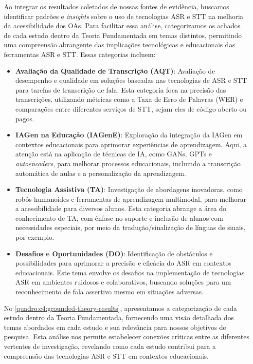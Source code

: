 Ao integrar os resultados coletados de nossas fontes de evidência, buscamos identificar padrões e \textit{insights} sobre o uso de tecnologias ASR e STT na melhoria da acessibilidade dos OAs. Para facilitar essa análise, categorizamos os achados de cada estudo dentro da Teoria Fundamentada em temas distintos, permitindo uma compreensão abrangente das implicações tecnológicas e educacionais das ferramentas ASR e STT. Essas categorias incluem:

\begin{itemize}
\item \textbf{Avaliação da Qualidade de Transcrição (AQT)}: Avaliação de desempenho e qualidade em soluções baseadas nas tecnologias de ASR e STT para tarefas de transcrição de fala. Esta categoria foca na precisão das transcrições, utilizando métricas como a Taxa de Erro de Palavras (WER) e comparações entre diferentes serviços de STT, sejam eles de código aberto ou pagos.

\item \textbf{IAGen na Educação (IAGenE)}: Exploração da integração da IAGen em contextos educacionais para aprimorar experiências de aprendizagem. Aqui, a atenção está na aplicação de técnicas de IA, como GANs, GPTs e \textit{autoencoders}, para melhorar processos educacionais, incluindo a transcrição automática de aulas e a personalização da aprendizagem.

\item \textbf{Tecnologia Assistiva (TA)}: Investigação de abordagens inovadoras, como robôs humanoides e ferramentas de aprendizagem multimodal, para melhorar a acessibilidade para diversos alunos. Esta categoria abrange a área do conhecimento de TA, com ênfase no suporte e inclusão de alunos com necessidades especiais, por meio da tradução/sinalização de línguas de sinais, por exemplo.

\item \textbf{Desafios e Oportunidades (DO)}: Identificação de obstáculos e possibilidades para aprimorar a precisão e eficácia do ASR em contextos educacionais. Este tema envolve os desafios na implementação de tecnologias ASR em ambientes ruidosos e colaborativos, buscando soluções para um reconhecimento de fala assertivo mesmo em situações adversas.
\end{itemize}

No \autoref{quadro:c4:grounded-theory-results}, apresentamos a categorização de cada estudo dentro da Teoria Fundamentada, fornecendo uma visão detalhada dos temas abordados em cada estudo e sua relevância para nossos objetivos de pesquisa. Esta análise nos permite estabelecer conexões críticas entre as diferentes vertentes de investigação, revelando como cada estudo contribui para a compreensão das tecnologias ASR e STT em contextos educacionais.

